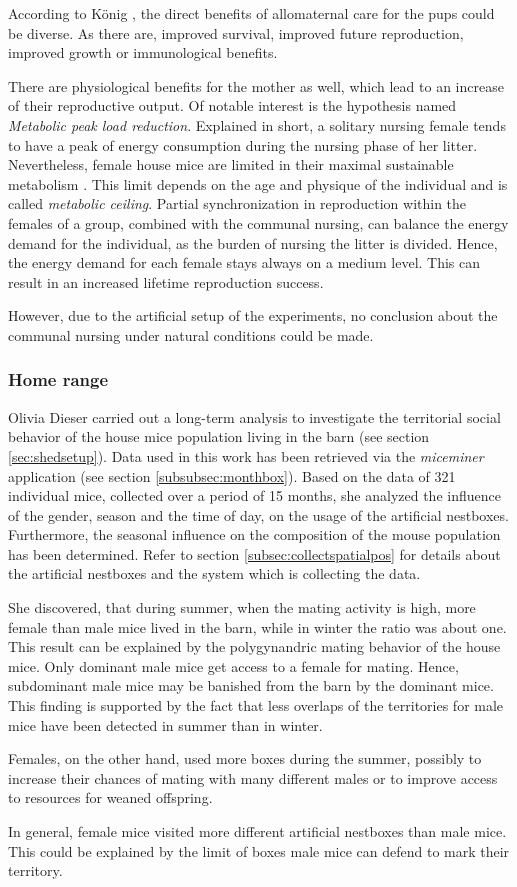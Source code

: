 According to K\"onig \cite{koenig:06}, the direct benefits of allomaternal care for the pups could be diverse. As there are, improved survival, improved future reproduction, improved growth or immunological benefits.

There are physiological benefits for the mother as well, which lead to an increase of their reproductive output. Of notable interest is the hypothesis named \textit{Metabolic peak load reduction}. Explained in short, a solitary nursing female tends to have a peak of energy consumption during the nursing phase of her litter. Nevertheless, female house mice are limited in their maximal sustainable metabolism \cite{hammond:92}. This limit depends on the age and physique of the individual and is called \textit{metabolic ceiling}. Partial synchronization in reproduction within the females of a group, combined with the communal nursing, can balance the energy demand for the individual, as the burden of nursing the litter is divided. Hence, the energy demand for each female stays always on a medium level\cite{koenig:06}. This can result in an increased lifetime reproduction success.

However, due to the artificial setup of the experiments, no conclusion about the communal nursing under natural conditions could be made.

\subsubsection{Home range}
\label{subsubsec:homerange}

Olivia Dieser \cite{dieser:08} carried out a long-term analysis to investigate the territorial social behavior of the house mice population living in the barn (see section \ref{sec:shedsetup}). Data used in this work has been retrieved via the \textit{miceminer} application (see section \ref{subsubsec:monthbox}). Based on the data of 321 individual mice, collected over a period of 15 months, she analyzed the influence of the gender, season and the time of day, on the usage of the artificial nestboxes. Furthermore, the seasonal influence on the composition of the mouse population has been determined. Refer to section \ref{subsec:collectspatialpos} for details about the artificial nestboxes and the system which is collecting the data.

She discovered, that during summer, when the mating activity is high, more female than male mice lived in the barn, while in winter the ratio was about one. This result can be explained by the polygynandric mating behavior of the house mice. Only dominant male mice get access to a female for mating. Hence, subdominant male mice may be banished from the barn by the dominant mice. This finding is supported by the fact that less overlaps of the territories for male mice have been detected in summer than in winter. 

Females, on the other hand, used more boxes during the summer, possibly to increase their chances of mating with many different males or to improve access to resources for weaned offspring.

In general, female mice visited more different artificial nestboxes than male mice. This could be explained by the limit of boxes male mice can defend to mark their territory.
